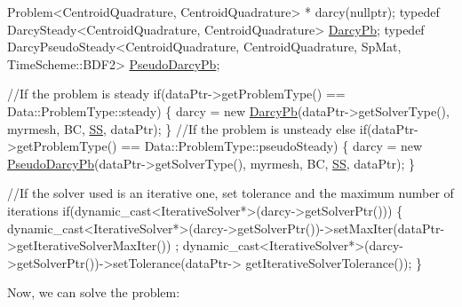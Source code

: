 \begin{DoxyCode}
Problem<CentroidQuadrature, CentroidQuadrature> * darcy(\textcolor{keyword}{nullptr});
\textcolor{keyword}{typedef} DarcySteady<CentroidQuadrature, CentroidQuadrature> \hyperlink{main_8cpp_ab0de87680f9f2dfa547e659c7da3d1e4}{DarcyPb};
\textcolor{keyword}{typedef} DarcyPseudoSteady<CentroidQuadrature, CentroidQuadrature, SpMat, TimeScheme::BDF2> 
      \hyperlink{main_8cpp_aff54e4c6bbc30b11899898af00325b15}{PseudoDarcyPb};

\textcolor{comment}{//If the problem is steady}
\textcolor{keywordflow}{if}(dataPtr->getProblemType() == Data::ProblemType::steady)
\{
    darcy = \textcolor{keyword}{new} \hyperlink{main_8cpp_ab0de87680f9f2dfa547e659c7da3d1e4}{DarcyPb}(dataPtr->getSolverType(), myrmesh, BC, \hyperlink{namespaceFVCode3D_ae8b0f97f0774db9f0881cfc5f31d93f4}{SS}, dataPtr);
\}
\textcolor{comment}{//If the problem is unsteady}
\textcolor{keywordflow}{else} \textcolor{keywordflow}{if}(dataPtr->getProblemType() == Data::ProblemType::pseudoSteady)
\{
    darcy = \textcolor{keyword}{new} \hyperlink{main_8cpp_aff54e4c6bbc30b11899898af00325b15}{PseudoDarcyPb}(dataPtr->getSolverType(), myrmesh, BC, 
      \hyperlink{namespaceFVCode3D_ae8b0f97f0774db9f0881cfc5f31d93f4}{SS}, dataPtr);
\}

\textcolor{comment}{//If the solver used is an iterative one, set tolerance and the maximum number of iterations}
\textcolor{keywordflow}{if}(dynamic\_cast<IterativeSolver*>(darcy->getSolverPtr()))
\{
    \textcolor{keyword}{dynamic\_cast<}IterativeSolver*\textcolor{keyword}{>}(darcy->getSolverPtr())->setMaxIter(dataPtr->getIterativeSolverMaxIter())
      ;
    \textcolor{keyword}{dynamic\_cast<}IterativeSolver*\textcolor{keyword}{>}(darcy->getSolverPtr())->setTolerance(dataPtr->
      getIterativeSolverTolerance());
\}
\end{DoxyCode}


Now, we can solve the problem\+:


